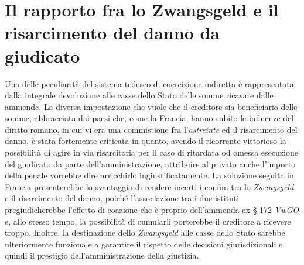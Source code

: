 \documentclass[12pt,it,a4paper,]{report}
\begin{document}
\hypertarget{il-rapporto-fra-lo-zwangsgeld-e-il-risarcimento-del-danno-da-giudicato}{%
\section{Il rapporto fra lo Zwangsgeld e il risarcimento del danno da
giudicato}\label{il-rapporto-fra-lo-zwangsgeld-e-il-risarcimento-del-danno-da-giudicato}}

Una delle peculiarità del sistema tedesco di coercizione indiretta è
rappresentata dalla integrale devoluzione alle casse dello Stato delle
somme ricavate dalle ammende. La diversa impostazione che vuole che il
creditore sia beneficiario delle somme, abbracciata dai paesi che, come
la Francia, hanno subito le influenze del diritto romano, in cui vi era
una commistione fra l'\emph{astreinte} ed il risarcimento del danno, è
stata fortemente criticata in quanto, avendo il ricorrente vittorioso la
possibilità di agire in via risarcitoria per il caso di ritardata od
omessa esecuzione del giudicato da parte dell'amministrazione,
attribuire al privato anche l'importo della penale vorrebbe dire
arricchirlo ingiustificatamente. La soluzione seguita in Francia
presenterebbe lo svantaggio di rendere incerti i confini tra lo
\emph{Zwangsgeld} e il risarcimento del danno, poiché l'associazione tra
i due istituti pregiudicherebbe l'effetto di coazione che è proprio
dell'ammenda ex § 172 \emph{VwGO} e, allo stesso tempo, la possibilità
di cumularli porterebbe il creditore a ricevere troppo. Inoltre, la
destinazione dello \emph{Zwangsgeld} alle casse dello Stato sarebbe
ulteriormente funzionale a garantire il rispetto delle decisioni
giurisdizionali e quindi il prestigio dell'amministrazione della
giustizia.
\end{document}
